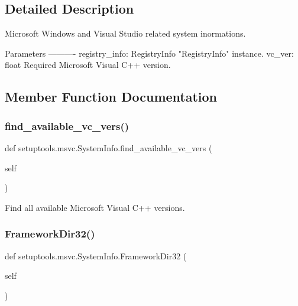 \subsection{Detailed Description}
\begin{DoxyVerb}Microsoft Windows and Visual Studio related system inormations.

Parameters
----------
registry_info: RegistryInfo
    "RegistryInfo" instance.
vc_ver: float
    Required Microsoft Visual C++ version.
\end{DoxyVerb}
 

\subsection{Member Function Documentation}
\mbox{\label{classsetuptools_1_1msvc_1_1_system_info_a6ca135d6a2764687c0fae38efbe7651d}} 
\subsubsection{\texorpdfstring{find\+\_\+available\+\_\+vc\+\_\+vers()}{find\_available\_vc\_vers()}}
{\footnotesize\ttfamily def setuptools.\+msvc.\+System\+Info.\+find\+\_\+available\+\_\+vc\+\_\+vers (\begin{DoxyParamCaption}\item[{}]{self }\end{DoxyParamCaption})}

\begin{DoxyVerb}Find all available Microsoft Visual C++ versions.
\end{DoxyVerb}
 \mbox{\label{classsetuptools_1_1msvc_1_1_system_info_ac293ac926386145b04dfc6d9c2b5e2e3}} 
\subsubsection{\texorpdfstring{Framework\+Dir32()}{FrameworkDir32()}}
{\footnotesize\ttfamily def setuptools.\+msvc.\+System\+Info.\+Framework\+Dir32 (\begin{DoxyParamCaption}\item[{}]{self }\end{DoxyParamCaption})}

